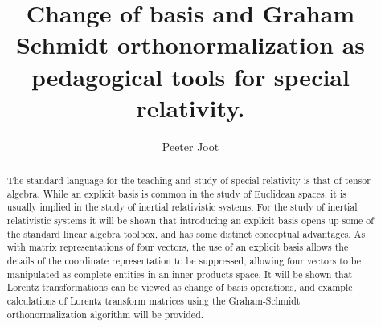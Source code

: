\documentclass[iop,onecolumn]{emulateapj}
\begin{document}
\title{Change of basis and Graham Schmidt orthonormalization as pedagogical tools for special relativity.}

\author{
Peeter Joot 
}


\begin{abstract}

The standard language for the teaching and study of special relativity is that of tensor algebra.
While an explicit basis is common in the study of Euclidean spaces, it is usually implied in the study of inertial relativistic systems.
For the study of inertial relativistic systems it will be shown that introducing an explicit basis opens up some of the standard linear algebra toolbox, and has some distinct conceptual advantages.
As with matrix representations of four vectors, the use of an explicit basis allows the details of the coordinate representation to be suppressed, allowing four vectors to be manipulated as complete entities in an inner products space.
It will be shown that Lorentz transformations can be viewed as change of basis operations, and example calculations of Lorentz transform matrices using the Graham-Schmidt orthonormalization algorithm will be provided.

\end{abstract}


%
%
%
%
%
%
%
%
%
%
%
\end{document}
